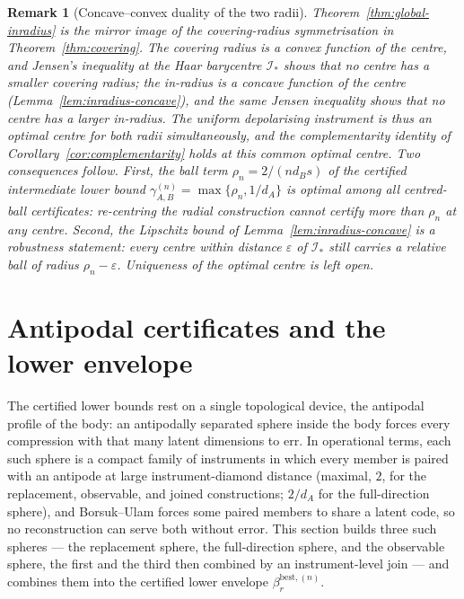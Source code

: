 \documentclass[11pt,a4paper]{article}
\newtheorem{remark}[theorem]{Remark}
\begin{document}
\begin{remark}[Concave--convex duality of the two radii]
\label{rem:duality}
Theorem~\ref{thm:global-inradius} is the mirror image of the covering-radius symmetrisation in Theorem~\ref{thm:covering}. The covering radius is a convex function of the centre, and Jensen's inequality at the Haar barycentre $\mathcal I_*$ shows that no centre has a smaller covering radius; the in-radius is a concave function of the centre (Lemma~\ref{lem:inradius-concave}), and the same Jensen inequality shows that no centre has a larger in-radius. The uniform depolarising instrument is thus an optimal centre for both radii simultaneously, and the complementarity identity of Corollary~\ref{cor:complementarity} holds at this common optimal centre. Two consequences follow. First, the ball term $\rho_n=2/(nd_Bs)$ of the certified intermediate lower bound $\gamma_{A,B}^{(n)}=\max\{\rho_n,1/d_A\}$ is optimal among all centred-ball certificates: re-centring the radial construction cannot certify more than $\rho_n$ at any centre. Second, the Lipschitz bound of Lemma~\ref{lem:inradius-concave} is a robustness statement: every centre within distance $\varepsilon$ of $\mathcal I_*$ still carries a relative ball of radius $\rho_n-\varepsilon$. Uniqueness of the optimal centre is left open.
\end{remark}

\section{Antipodal certificates and the lower envelope}
\label{sec:lower}

The certified lower bounds rest on a single topological device, the antipodal profile of the body: an antipodally separated sphere inside the body forces every compression with that many latent dimensions to err. In operational terms, each such sphere is a compact family of instruments in which every member is paired with an antipode at large instrument-diamond distance (maximal, $2$, for the replacement, observable, and joined constructions; $2/d_A$ for the full-direction sphere), and Borsuk--Ulam forces some paired members to share a latent code, so no reconstruction can serve both without error. This section builds three such spheres --- the replacement sphere, the full-direction sphere, and the observable sphere, the first and the third then combined by an instrument-level join --- and combines them into the certified lower envelope $\beta_r^{\mathrm{best},(n)}$.
\end{document}
